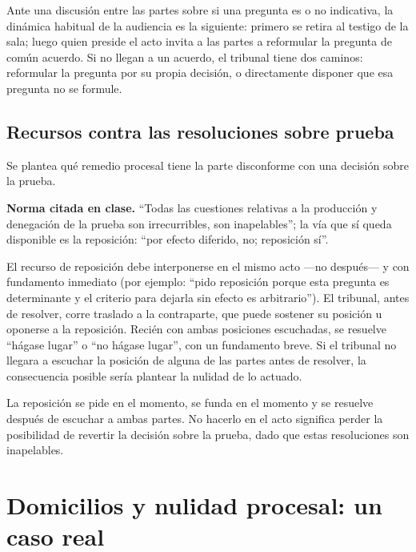 \documentclass[12pt,oneside]{book}
\begin{document}
Ante una discusión entre las partes sobre si una pregunta es o no indicativa, la dinámica habitual de la audiencia es la siguiente: primero se retira al testigo de la sala; luego quien preside el acto invita a las partes a reformular la pregunta de común acuerdo. Si no llegan a un acuerdo, el tribunal tiene dos caminos: reformular la pregunta por su propia decisión, o directamente disponer que esa pregunta no se formule.

\section{Recursos contra las resoluciones sobre prueba}

Se plantea qué remedio procesal tiene la parte disconforme con una decisión sobre la prueba.

\begin{important}
\textbf{Norma citada en clase.} ``Todas las cuestiones relativas a la producción y denegación de la prueba son irrecurribles, son inapelables''; la vía que sí queda disponible es la reposición: ``por efecto diferido, no; reposición sí''.
\end{important}

El recurso de reposición debe interponerse en el mismo acto ---no después--- y con fundamento inmediato (por ejemplo: ``pido reposición porque esta pregunta es determinante y el criterio para dejarla sin efecto es arbitrario''). El tribunal, antes de resolver, corre traslado a la contraparte, que puede sostener su posición u oponerse a la reposición. Recién con ambas posiciones escuchadas, se resuelve ``hágase lugar'' o ``no hágase lugar'', con un fundamento breve. Si el tribunal no llegara a escuchar la posición de alguna de las partes antes de resolver, la consecuencia posible sería plantear la nulidad de lo actuado.

\begin{important}
La reposición se pide en el momento, se funda en el momento y se resuelve después de escuchar a ambas partes. No hacerlo en el acto significa perder la posibilidad de revertir la decisión sobre la prueba, dado que estas resoluciones son inapelables.
\end{important}

\chapter{Domicilios y nulidad procesal: un caso real}
\end{document}

